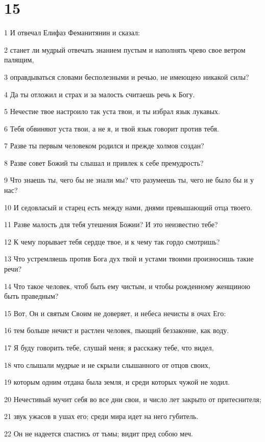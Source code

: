 \chapter{15}

\par 1 И отвечал Елифаз Феманитянин и сказал:
\par 2 станет ли мудрый отвечать знанием пустым и наполнять чрево свое ветром палящим,
\par 3 оправдываться словами бесполезными и речью, не имеющею никакой силы?
\par 4 Да ты отложил и страх и за малость считаешь речь к Богу.
\par 5 Нечестие твое настроило так уста твои, и ты избрал язык лукавых.
\par 6 Тебя обвиняют уста твои, а не я, и твой язык говорит против тебя.
\par 7 Разве ты первым человеком родился и прежде холмов создан?
\par 8 Разве совет Божий ты слышал и привлек к себе премудрость?
\par 9 Что знаешь ты, чего бы не знали мы? что разумеешь ты, чего не было бы и у нас?
\par 10 И седовласый и старец есть между нами, днями превышающий отца твоего.
\par 11 Разве малость для тебя утешения Божии? И это неизвестно тебе?
\par 12 К чему порывает тебя сердце твое, и к чему так гордо смотришь?
\par 13 Что устремляешь против Бога дух твой и устами твоими произносишь такие речи?
\par 14 Что такое человек, чтоб быть ему чистым, и чтобы рожденному женщиною быть праведным?
\par 15 Вот, Он и святым Своим не доверяет, и небеса нечисты в очах Его:
\par 16 тем больше нечист и растлен человек, пьющий беззаконие, как воду.
\par 17 Я буду говорить тебе, слушай меня; я расскажу тебе, что видел,
\par 18 что слышали мудрые и не скрыли слышанного от отцов своих,
\par 19 которым одним отдана была земля, и среди которых чужой не ходил.
\par 20 Нечестивый мучит себя во все дни свои, и число лет закрыто от притеснителя;
\par 21 звук ужасов в ушах его; среди мира идет на него губитель.
\par 22 Он не надеется спастись от тьмы; видит пред собою меч.

